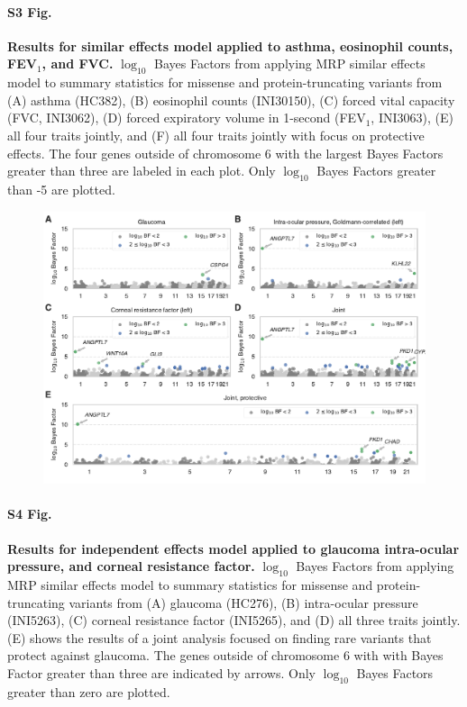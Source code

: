 \paragraph*{S3 Fig.}
\label{asthma_similar}
{\bf Results for similar effects model applied to asthma, eosinophil counts, FEV$_1$, and FVC.} $\log_{10}$ Bayes Factors from applying MRP similar effects model to summary statistics for missense and protein-truncating variants from (A) asthma (HC382), (B) eosinophil counts (INI30150), (C) forced vital capacity (FVC, INI3062), (D) forced expiratory volume in 1-second (FEV$_1$, INI3063), (E) all four traits jointly, and (F) all four traits jointly with focus on protective effects. The four genes outside of chromosome 6 with the largest Bayes Factors greater than three are labeled in each plot. Only $\log_{10}$ Bayes Factors greater than -5 are plotted.

\begin{figure}[H]
\includegraphics[width=\textwidth]{../figures/Figure_S04.pdf}
\end{figure}
\paragraph*{S4 Fig.}
\label{glaucoma_similar}
{\bf Results for independent effects model applied to glaucoma intra-ocular pressure, and corneal resistance factor.} $\log_{10}$ Bayes Factors from applying MRP similar effects model to summary statistics for missense and protein-truncating variants from (A) glaucoma (HC276), (B) intra-ocular pressure (INI5263), (C) corneal resistance factor (INI5265), and (D) all three traits jointly. (E) shows the results of a joint analysis focused on finding rare variants that protect against glaucoma. The genes outside of chromosome 6 with with Bayes Factor greater than three are indicated by arrows. Only $\log_{10}$ Bayes Factors greater than zero are plotted.

